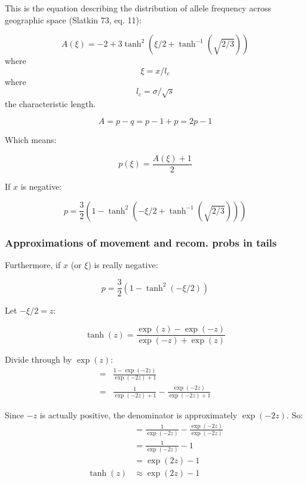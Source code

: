 \documentclass[12pt]{article}
\title{}
\author{}
\date{} %
\begin{document}
\maketitle


This is the equation describing the distribution of allele frequency across geographic space (Slatkin 73, eq. 11):

\begin{equation}
A(\xi) = -2 + 3\tanh^2(\xi/2 + \tanh^{-1}(\sqrt{2/3}))
\end{equation}
where
\begin{equation}
\xi = x/l_c
\end{equation}
where 
\begin{equation}
l_c = \sigma/\sqrt{s}
\end{equation}
the characteristic length.

$$A = p-q = p - 1+p = 2p-1$$

Which means:

\begin{equation}
p(\xi) = \frac{A(\xi)+1}{2}
\end{equation}


If $x$ is negative:

\begin{equation}
p = \frac{3}{2}(1-\tanh^2(-\xi/2 + \tanh^{-1}(\sqrt{2/3})))
\end{equation}


\subsubsection{Approximations of movement and recom. probs in tails}
Furthermore, if $x$ (or $\xi$) is really negative:

\begin{equation}
p = \frac{3}{2}(1-\tanh^2( -\xi/2))
\end{equation}

Let $-\xi/2 = z$:

\begin{equation}
\tanh(z) = \frac{\exp(z) - \exp(-z)}{\exp(-z) + \exp(z)}
\end{equation}

Divide through by $\exp(z)$:
\begin{eqnarray}
= &\frac{1 - \exp(-2z)}{\exp(-2z) + 1}\\
 = &\frac{1}{\exp(-2z) +1} - \frac{\exp(-2z)}{\exp(-2z) +1}
\end{eqnarray}

Since $-z$ is actually positive, the denominator is approximately $\exp(-2z)$. So:
\begin{eqnarray}
& = \frac{1}{\exp(-2z) } - \frac{\exp(-2z)}{\exp(-2z) }\\
 &= \frac{1}{\exp(-2z) } -1 \\
& = {\exp(2z) } -1 \\
\tanh(z) & \approx \exp(2z) - 1
\end{eqnarray}
\end{document}
